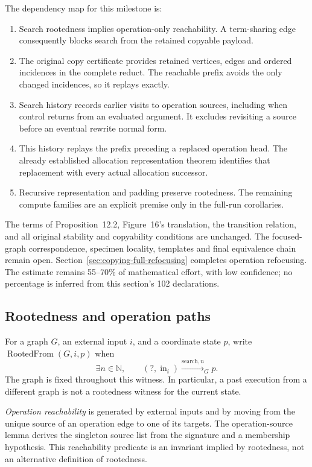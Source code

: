 The dependency map for this milestone is:
\begin{enumerate}
\item Search rootedness implies operation-only reachability. A term-sharing
edge consequently blocks search from the retained copyable payload.
\item The original copy certificate provides retained vertices, edges and
ordered incidences in the complete reduct. The reachable prefix avoids the
only changed incidences, so it replays exactly.
\item Search history records earlier visits to operation sources, including
when control returns from an evaluated argument. It excludes revisiting a
source before an eventual rewrite normal form.
\item This history replays the prefix preceding a replaced operation head.
The already established allocation representation theorem identifies that
replacement with every actual allocation successor.
\item Recursive representation and padding preserve rootedness. The remaining
compute families are an explicit premise only in the full-run corollaries.
\end{enumerate}
The terms of Proposition~12.2, Figure~16's translation, the transition relation,
and all original stability and copyability conditions are unchanged.
The focused-graph correspondence, specimen locality, templates and final
equivalence chain remain open. Section~\ref{sec:copying-full-refocusing}
completes operation refocusing. The estimate
remains 55--70\% of mathematical effort, with low confidence; no percentage is
inferred from this section's 102 declarations.

\subsection{Rootedness and operation paths}

For a graph $G$, an external input $i$, and a coordinate state $p$, write
$\operatorname{RootedFrom}(G,i,p)$ when
\[
 \exists n\in\mathbb N,\qquad (?,\operatorname{in}_i)
       \xrightarrow{\mathrm{search},n}_{G}p.
\]
The graph is fixed throughout this witness. In particular, a past execution
from a different graph is not a rootedness witness for the current state.


\emph{Operation reachability} is generated by external inputs and by moving
from the unique source of an operation edge to one of its targets. The
operation-source lemma derives the singleton source list from the signature
and a membership hypothesis. This reachability predicate is an invariant
implied by rootedness, not an alternative definition of rootedness.

